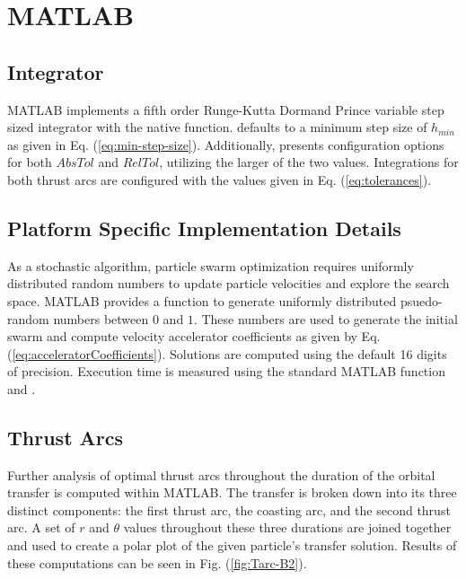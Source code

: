 \section{MATLAB}

\subsection{Integrator}

\noindent MATLAB implements a fifth order Runge-Kutta Dormand Prince variable step sized integrator with the native  function. 
defaults to a minimum step size of $h_{min}$ as given in Eq. (\ref{eq:min-step-size}). Additionally, 
presents configuration options for both $AbsTol$ and $RelTol$, utilizing the larger of the two values.
Integrations for both thrust arcs are configured with the values given in Eq. (\ref{eq:tolerances}).

\subsection{Platform Specific Implementation Details}

\noindent As a stochastic algorithm, particle swarm optimization requires uniformly distributed random numbers to update particle velocities 
and explore the search space. MATLAB provides a  function to generate uniformly distributed
psuedo-random numbers between $0$ and $1$. These numbers are used to generate the initial swarm and compute velocity accelerator coefficients as given by Eq. (\ref{eq:acceleratorCoefficients}).
Solutions are computed using the default 16 digits of precision. Execution time is measured using the standard MATLAB
function  and .


\subsection{Thrust Arcs}

\noindent Further analysis of optimal thrust arcs throughout the duration of the orbital transfer is computed within MATLAB.
The transfer is broken down into its three distinct components: the first thrust arc, the coasting arc, and the second thrust arc. 
A set of $r$ and $\theta$ values throughout these three durations are joined together and used to create a polar plot of the given particle's transfer
solution. Results of these computations can be seen in Fig. (\ref{fig:Tarc-B2}). \newline

